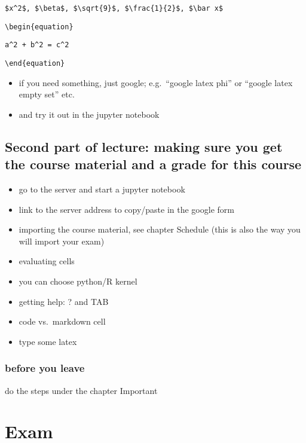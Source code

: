\documentclass[]{book}
\providecommand{\tightlist}{%
  \setlength{\itemsep}{0pt}\setlength{\parskip}{0pt}}
\begin{document}
\texttt{\$x\^{}2\$,\ \$\textbackslash{}beta\$,\ \$\textbackslash{}sqrt\{9\}\$,\ \$\textbackslash{}frac\{1\}\{2\}\$,\ \$\textbackslash{}bar\ x\$}

\texttt{\textbackslash{}begin\{equation\}}

\texttt{a\^{}2\ +\ b\^{}2\ =\ c\^{}2}

\texttt{\textbackslash{}end\{equation\}}

\begin{itemize}
\tightlist
\item
  if you need something, just google; e.g.~``google latex phi'' or ``google latex empty set'' etc.
\item
  and try it out in the jupyter notebook
\end{itemize}

\hypertarget{second-part-of-lecture-making-sure-you-get-the-course-material-and-a-grade-for-this-course}{%
\section{Second part of lecture: making sure you get the course material and a grade for this course}\label{second-part-of-lecture-making-sure-you-get-the-course-material-and-a-grade-for-this-course}}

\begin{itemize}
\tightlist
\item
  go to the server and start a jupyter notebook
\item
  link to the server address to copy/paste in the google form
\item
  importing the course material, see chapter Schedule (this is also the way you will import your exam)
\item
  evaluating cells
\item
  you can choose python/R kernel
\item
  getting help: ? and TAB
\item
  code vs.~markdown cell
\item
  type some latex
\end{itemize}

\hypertarget{before-you-leave}{%
\subsection{before you leave}\label{before-you-leave}}

do the steps under the chapter Important

\hypertarget{exam-1}{%
\chapter{Exam}\label{exam-1}}
\end{document}
